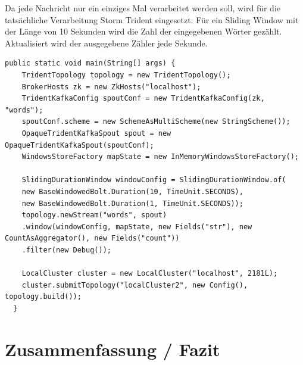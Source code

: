 \documentclass[a4paper,11pt]{scrartcl}
\begin{document}

  Da jede Nachricht nur ein einziges Mal verarbeitet werden soll, wird
  für die tatsächliche Verarbeitung Storm Trident eingesetzt. Für ein
  Sliding Window mit der Länge von 10 Sekunden wird die Zahl der
  eingegebenen Wörter gezählt. Aktualisiert wird der ausgegebene
  Zähler jede Sekunde.

  \begin{lstlisting}[caption={Beispielimplementierung zur Ermittlung der Tippgeschwindigkeit}]
  public static void main(String[] args) {
    TridentTopology topology = new TridentTopology();
    BrokerHosts zk = new ZkHosts("localhost");
    TridentKafkaConfig spoutConf = new TridentKafkaConfig(zk, "words");
    spoutConf.scheme = new SchemeAsMultiScheme(new StringScheme());
    OpaqueTridentKafkaSpout spout = new OpaqueTridentKafkaSpout(spoutConf);
    WindowsStoreFactory mapState = new InMemoryWindowsStoreFactory();

    SlidingDurationWindow windowConfig = SlidingDurationWindow.of(
    new BaseWindowedBolt.Duration(10, TimeUnit.SECONDS),
    new BaseWindowedBolt.Duration(1, TimeUnit.SECONDS));
    topology.newStream("words", spout)
    .window(windowConfig, mapState, new Fields("str"), new CountAsAggregator(), new Fields("count"))
    .filter(new Debug());

    LocalCluster cluster = new LocalCluster("localhost", 2181L);
    cluster.submitTopology("localCluster2", new Config(), topology.build());
  }
  \end{lstlisting}


  \section{Zusammenfassung / Fazit}
  
  

  
\end{document}
